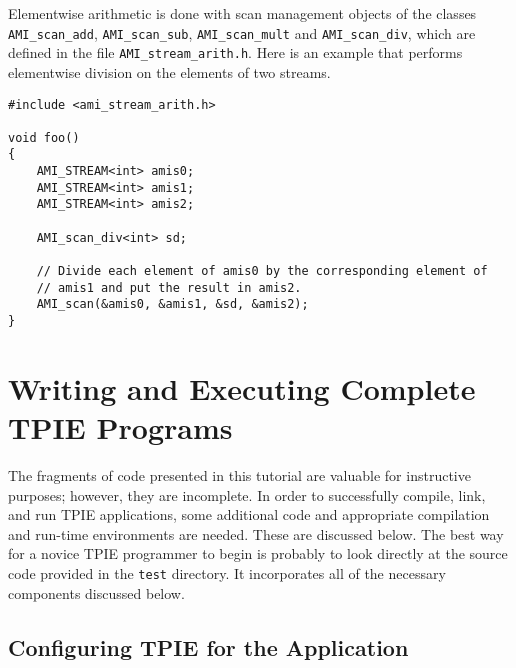 Elementwise arithmetic is done with scan management objects
 of the classes
\verb|AMI_scan_add|, \verb|AMI_scan_sub|, \verb|AMI_scan_mult| and
\verb|AMI_scan_div|, which are defined in the file
\verb|AMI_stream_arith.h|.  Here is an example that performs
elementwise division on the elements of two streams.

\begin{verbatim}
#include <ami_stream_arith.h>

void foo()
{
    AMI_STREAM<int> amis0;
    AMI_STREAM<int> amis1;
    AMI_STREAM<int> amis2;

    AMI_scan_div<int> sd;

    // Divide each element of amis0 by the corresponding element of
    // amis1 and put the result in amis2.
    AMI_scan(&amis0, &amis1, &sd, &amis2);
}
\end{verbatim}


\section{Writing and Executing Complete TPIE Programs}
\label{sec:complete}

The fragments of code presented in this tutorial are valuable for
instructive purposes; however, they are incomplete.  In order to
successfully compile, link, and run TPIE applications, some additional
code and appropriate compilation and run-time environments are needed.
These are discussed below.  The best way for a novice TPIE programmer
to begin is probably to look directly at the source code provided in
the {\tt test} directory.  It incorporates all of the necessary
components discussed below.

\subsection{Configuring TPIE for the Application}
\label{sec:macros}

